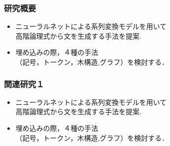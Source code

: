 \documentclass[dvipdfmx,cjk]{beamer}
\begin{document}
\begin{frame}
\frametitle{研究概要}
\begin{center}
\end{center}
\begin{block}{}
  \begin{itemize}
    \item ニューラルネットによる系列変換モデルを用いて\\高階論理式から文を生成する手法を提案.
    \item 埋め込みの際，４種の手法\\（記号，トークン，木構造,グラフ）を検討する．
  \end{itemize}
\end{block}

\end{frame}


\begin{frame}
\frametitle{関連研究１}
\begin{center}
\end{center}
\begin{block}{}
  \begin{itemize}
    \item ニューラルネットによる系列変換モデルを用いて\\{\color{berry}高階論理式}から文を生成する手法を提案.
    \item 埋め込みの際，４種の手法\\（記号，トークン，木構造,グラフ）を検討する．
  \end{itemize}
\end{block}

\end{frame}
\end{document}
